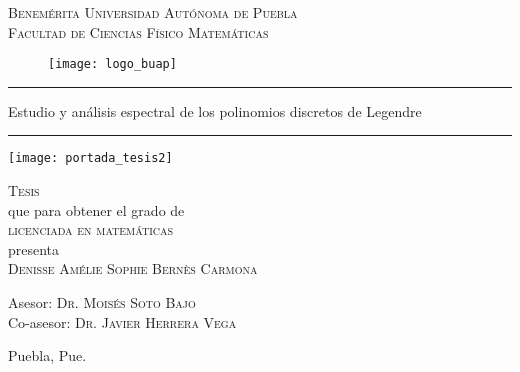 

\begin{center}
{\Large{
\textsc{Benemérita Universidad Autónoma de Puebla}
}} \\
\vspace{0.5cm}
{\Large{
\textsc{Facultad de Ciencias Físico Matemáticas}
}}
\end{center}


\begin{figure}[H]
	\centering
	\texttt{[image: logo\_buap]} 
\end{figure}	



\hrule
\vspace{0.5cm}
\begin{center}
{\Large {Estudio y análisis espectral de los polinomios discretos de Legendre}}
\end{center}
\vspace{0.5cm}
\hrule


\begin{marginfigure}
\texttt{[image: portada\_tesis2]} 
\end{marginfigure}






\vspace{4cm}

\noindent
\textsc{Tesis} \\
que para obtener el grado de \\
\textsc{licenciada en matemáticas} \\
presenta \\
\textsc{Denisse Amélie Sophie Bernès Carmona}



\vspace{2cm}

\noindent
Asesor: \textsc{Dr. Moisés Soto Bajo} \\
Co-asesor: \textsc{Dr. Javier Herrera Vega} 




\vspace*{\fill}
Puebla, Pue. 









\newpage